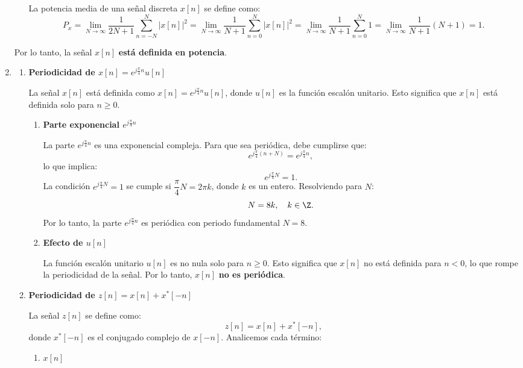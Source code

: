 \begin{enumerate}[label=\color{red}\textbf{\arabic*)}]
\begin{enumerate}[label=\textbf{\arabic*)}]
            La potencia media de una señal discreta $x[n]$ se define como:  \[
                P_x=\lim_{N \to \infty} \dfrac{1}{2N+1}\sum_{n=-N}^{N} |x[n]|^2=\lim_{N \to \infty} \dfrac{1}{N+1}\sum_{n=0}^{N} |x[n]|^2=\lim_{N \to \infty} \dfrac{1}{N+1}\sum_{n=0}^{N}1=\lim_{N \to \infty} \dfrac{1}{N+1}(N+1)=1. 
            \] 
    \end{enumerate}
    Por lo tanto, la señal $x[n]$ \textbf{está definida en potencia}.
\item {}
    \begin{enumerate}[label=\textbf{\arabic*)}]
        \item \textbf{Periodicidad de $x[n]=e^{j\frac{\pi}{4} n} u[n]$} 

            La señal $x[n]$ está definida como  $x[n]=e^{j\frac{\pi}{4} n} u[n]$, donde $u[n]$ es la función escalón unitario. Esto significa que  $x[n]$ está definida solo para  $n\ge 0$.
            \begin{enumerate}[label=\textbf{\alph*)}]
                \item \textbf{Parte exponencial $e^{j\frac{\pi}{4} n} $} 

                    La parte $e^{j\frac{\pi}{4} n} $ es una exponencial compleja. Para que sea periódica, debe cumplirse que: \[
                    e^{j\frac{\pi}{4} (n+N)} =e^{j\frac{\pi}{4} n} ,
                    \] lo que implica: \[
                    e^{j\frac{\pi}{4} N} =1.
                    \] 
                    La condición $e^{j\frac{\pi}{4} N} =1$ se cumple si $\dfrac{\pi}{4}N=2\pi k$, donde $k$ es un entero. Resolviendo para $N$:  \[
                    N=8k,\quad k\in \Z.
                    \] 
                    Por lo tanto, la parte $e^{j\frac{\pi}{4} n} $ es periódica con periodo fundamental $N=8$.
                \item  \textbf{Efecto de $u[n]$} 

                    La función escalón unitario $u[n]$ es no nula solo para  $n\ge 0$. Esto significa que $x[n]$ no está definida para  $n<0$, lo que rompe la periodicidad de la señal. Por lo tanto,  $x[n]$  \textbf{no es periódica}. 
            \end{enumerate}
        \item \textbf{Periodicidad de $z[n]=x[n]+x^*[-n]$} 

            La señal $z[n]$ se define como:  \[
                z[n]=x[n]+x^*[-n],
            \] donde $x^*[-n]$ es el conjugado complejo de  $x[-n]$. Analicemos cada término:
             \begin{enumerate}[label=\textbf{\alph*)}]
                 \item $x[n]$


\end{enumerate}
\end{enumerate}
\end{enumerate}
